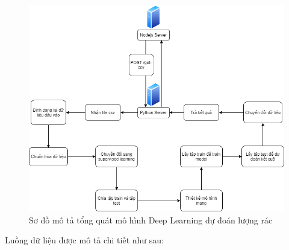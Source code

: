 \begin{figure}[H]
    \centering
    \includegraphics[width=\textwidth]{images/Khanh/Python/Python_general.png}
    \caption{Sơ đồ mô tả tổng quát mô hình Deep Learning dự đoán lượng rác}
    \label{fig:python_general}
\end{figure}

Luồng dữ liệu được mô tả chi tiết như sau:

